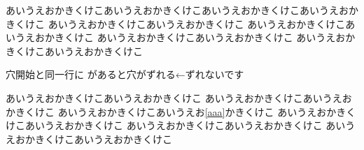 \documentclass[8pt,b5paper,twoside]{ltjsreport}
\begin{document}
あいうえおかきくけこあいうえおかきくけこあいうえおかきくけこあいうえおかきくけこ
あいうえおかきくけこあいうえおかきくけこ\blankstart
\blankmid
\blankmid[（１）]
\blankmid
\blankstop{160pt}あいうえおかきくけこあいうえおかきくけこ
あいうえおかきくけこあいうえおかきくけこ
あいうえおかきくけこあいうえおかきくけこ

穴開始と同一行に  があると穴がずれる←ずれないです

あいうえおかきくけこあいうえおかきくけこ
あいうえおかきくけこあいうえおかきくけこ
あいうえおかきくけこあいうえお\ref{aaa}かきくけこ\blankstart
\blankmid
\blankmid[（２）]
\blankmid
\blankstop{160pt}あいうえおかきくけこあいうえおかきくけこ
あいうえおかきくけこあいうえおかきくけこ
あいうえおかきくけこあいうえおかきくけこ
\end{document}
